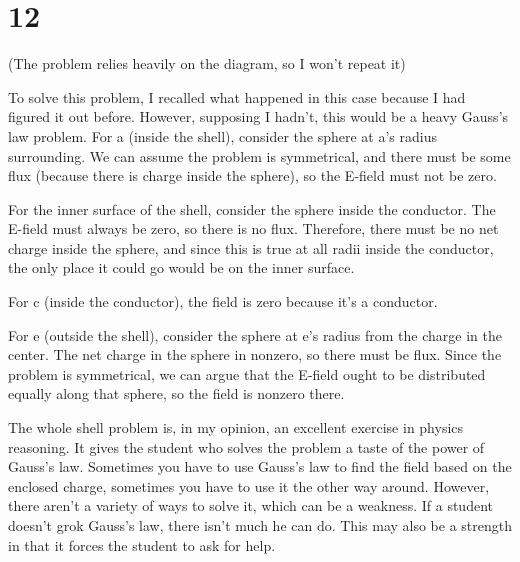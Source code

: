 \documentclass[11pt]{article}
\begin{document}
\section*{12}

(The problem relies heavily on the diagram, so I won't repeat it)

To solve this problem, I recalled what happened in this case because I
had figured it out before.  However, supposing I hadn't, this would be a
heavy Gauss's law problem.  For a (inside the shell), consider the
sphere at a's radius surrounding.  We can assume the problem is
symmetrical, and there must be some flux (because there is charge inside
the sphere), so the E-field must not be zero.

For the inner surface of the shell, consider the sphere inside the
conductor.  The E-field must always be zero, so there is no flux.
Therefore, there must be no net charge inside the sphere, and since this
is true at all radii inside the conductor, the only place it could go
would be on the inner surface.

For c (inside the conductor), the field is zero because it's a
conductor.

For e (outside the shell), consider the sphere at e's radius from the
charge in the center.  The net charge in the sphere in nonzero, so there
must be flux.  Since the problem is symmetrical, we can argue that the
E-field ought to be distributed equally along that sphere, so the field
is nonzero there.

The whole shell problem is, in my opinion, an excellent exercise in
physics reasoning.  It gives the student who solves the problem a taste
of the power of Gauss's law.  Sometimes you have to use Gauss's law to
find the field based on the enclosed charge, sometimes you have to use
it the other way around.  However, there aren't a variety of ways to
solve it, which can be a weakness.  If a student doesn't grok Gauss's
law, there isn't much he can do.  This may also be a strength in that it
forces the student to ask for help.
\end{document}
